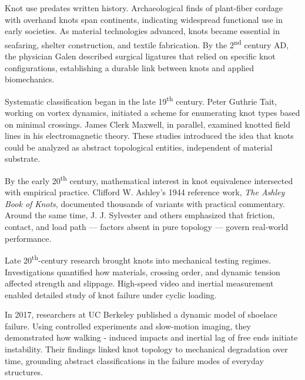 \begin{historical}
Knot use predates written history. Archaeological finds of plant-fiber cordage with overhand knots span continents, indicating widespread functional use in early societies. As material technologies advanced, knots became essential in seafaring, shelter construction, and textile fabrication. By the 2\textsuperscript{nd} century AD, the physician Galen described surgical ligatures that relied on specific knot configurations, establishing a durable link between knots and applied biomechanics.

Systematic classification began in the late 19\textsuperscript{th} century. Peter Guthrie Tait, working on vortex dynamics, initiated a scheme for enumerating knot types based on minimal crossings. James Clerk Maxwell, in parallel, examined knotted field lines in his electromagnetic theory. These studies introduced the idea that knots could be analyzed as abstract topological entities, independent of material substrate.

By the early 20\textsuperscript{th} century, mathematical interest in knot equivalence intersected with empirical practice. Clifford W. Ashley’s 1944 reference work, \emph{The Ashley Book of Knots}, documented thousands of variants with practical commentary. Around the same time, J. J. Sylvester and others emphasized that friction, contact, and load path — factors absent in pure topology — govern real-world performance.

Late 20\textsuperscript{th}-century research brought knots into mechanical testing regimes. Investigations quantified how materials, crossing order, and dynamic tension affected strength and slippage. High-speed video and inertial measurement enabled detailed study of knot failure under cyclic loading.

In 2017, researchers at UC Berkeley published a dynamic model of shoelace failure. Using controlled experiments and slow-motion imaging, they demonstrated how walking - induced impacts and inertial lag of free ends initiate instability. Their findings linked knot topology to mechanical degradation over time, grounding abstract classifications in the failure modes of everyday structures.
\end{historical}

